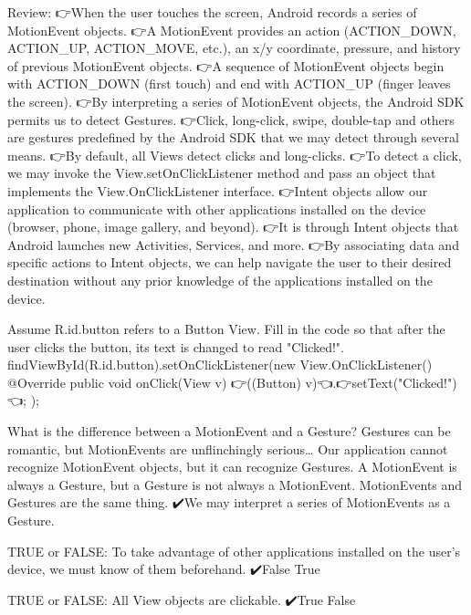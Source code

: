         Review:
            👉When the user touches the screen, Android records a series of MotionEvent objects.
            👉A MotionEvent provides an action (ACTION_DOWN, ACTION_UP, ACTION_MOVE, etc.), an x/y coordinate, pressure, and history of previous MotionEvent objects.
            👉A sequence of MotionEvent objects begin with ACTION_DOWN (first touch) and end with ACTION_UP (finger leaves the screen).
            👉By interpreting a series of MotionEvent objects, the Android SDK permits us to detect Gestures.
            👉Click, long-click, swipe, double-tap and others are gestures predefined by the Android SDK that we may detect through several means.
            👉By default, all Views detect clicks and long-clicks.
            👉To detect a click, we may invoke the View.setOnClickListener method and pass an object that implements the View.OnClickListener interface.
            👉Intent objects allow our application to communicate with other applications installed on the device (browser, phone, image gallery, and beyond).
            👉It is through Intent objects that Android launches new Activities, Services, and more.
            👉By associating data and specific actions to Intent objects, we can help navigate the user to their desired destination without any prior knowledge of the applications installed on the device.
            

            Assume R.id.button refers to a Button View. Fill in the code so that after the user clicks the button, its text is changed to read "Clicked!".
                findViewById(R.id.button).setOnClickListener(new View.OnClickListener() {
                    @Override
                    public void onClick(View v) {
                        👉((Button) v)👈.👉setText("Clicked!")👈;
                    }
                });

            What is the difference between a MotionEvent and a Gesture?
                Gestures can be romantic, but MotionEvents are unflinchingly serious…
                Our application cannot recognize MotionEvent objects, but it can recognize Gestures.
                A MotionEvent is always a Gesture, but a Gesture is not always a MotionEvent.
                MotionEvents and Gestures are the same thing.
                ✔️We may interpret a series of MotionEvents as a Gesture.

            TRUE or FALSE: To take advantage of other applications installed on the user’s device, we must know of them beforehand.
                ✔️False
                True

            TRUE or FALSE: All View objects are clickable.
                ✔️True
                False